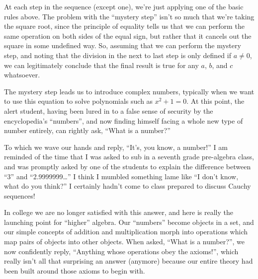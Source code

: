 At each step in the sequence (except one), we're just applying one of
the basic rules above.  The problem with the ``mystery step'' isn't so
much that we're taking the square root, since the principle of
equality tells us that we can perform the same operation on both sides
of the equal sign, but rather that it cancels out the square in some
undefined way.  So, assuming that we can perform the mystery step, and
noting that the division in the next to last step is only defined if
$a\ne0$, we can legitimately conclude that the final result is true
for any $a$, $b$, and $c$ whatsoever.

The mystery step leads us to introduce complex numbers,
typically when we want to use this equation to solve polynomials such
as $x^2+1=0$.  At this point, the alert student, having been lured in
to a false sense of security by the encyclopedia's ``numbers'', and
now finding himself facing a whole new type of number entirely, can
rightly ask, ``What is a number?''

To which we wave our hands and reply, ``It's, you know, a number!''
I am reminded of the time that I was asked to sub in a
seventh grade pre-algebra class, and was promptly asked by one of the
students to explain the difference between ``3'' and ``2.9999999\ldots''
I think I mumbled something lame like ``I don't know, what do you
think?'' I certainly hadn't come to class prepared to discuss Cauchy
sequences!

In college we are no longer satisfied with this answer, and here is
really the launching point for ``higher'' algebra.  Our ``numbers''
become objects in a set, and our simple concepts of addition and
multiplication morph into operations which map pairs of objects into
other objects.  When asked, ``What is a number?'', we now confidently
reply, ``Anything whose operations obey the axioms!'', which really
isn't all that surprising an answer (anymore) because our entire
theory had been built around those axioms to begin with.

